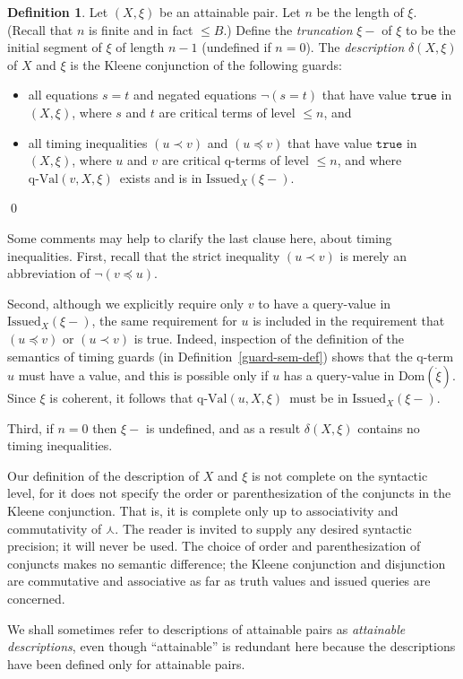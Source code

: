 \documentclass{LMCS}
\theoremstyle{definition}
\newtheorem{df}[thm]{Definition}
\newenvironment{ls}{\begin{itemize}}{\end{itemize}}
\newcommand{\Issued}{\text{Issued}}
\newcommand{\ans}{\dot}
\newcommand{\dom}[1]{\ensuremath{{\text{Dom}}(#1)}}
\newcommand{\kand}{\curlywedge}
\newcommand{\qval}[3]{\ensuremath{\text{q-Val}(#1,#2,#3)}}
\newcommand{\ttt}[1]{\ensuremath{\mathtt {#1}}}
\begin{document}
\begin{df}
Let $(X,\xi)$ be an attainable pair.  Let $n$ be
the length of $\xi$.  (Recall that $n$ is finite and in fact $\leq
B$.)  Define the \emph{truncation} $\xi-$ of $\xi$ to be the initial
segment of $\xi$ of length $n-1$ (undefined if $n=0$).  The
\emph{description} $\delta(X,\xi)$ of $X$ and $\xi$ is the Kleene
conjunction of the following guards:
\begin{ls}
\item all equations $s=t$ and negated equations $\neg(s=t)$ that have
  value \ttt{true} in $(X,\xi)$, where $s$ and $t$ are critical terms
  of level $\leq n$, and
\item all timing inequalities $(u\prec v)$ and $(u\preceq v)$ that
  have value \ttt{true} in $(X,\xi)$, where $u$ and $v$ are critical
  q-terms of level $\le n$, and where \qval vX\xi\ exists and is in
  $\Issued_X(\xi-)$.
\end{ls}
\qed\end{df}

Some comments may help to clarify the last clause here, about
timing inequalities.  First, recall that the strict inequality
$(u\prec v)$ is merely an abbreviation of $\neg(v\preceq u)$.

Second, although we explicitly require only $v$ to have a query-value
in $\Issued_X(\xi-)$,
the same requirement for $u$ is included in the
requirement that $(u\preceq v)$ or $(u\prec v)$ is true.  Indeed,
inspection of the definition of the semantics of timing guards (in
Definition~\ref{guard-sem-def}) shows that the q-term $u$ must have a
value, and this is possible only if $u$ has a query-value in
\dom{\ans\xi}.  Since $\xi$ is coherent, it follows that \qval uX\xi\
must be in $\Issued_X(\xi-)$.

Third, if $n=0$ then $\xi-$ is undefined, and as a result
$\delta(X,\xi)$ contains no timing inequalities.

Our definition of the description of $X$ and $\xi$ is not complete on
the syntactic level, for it does not specify the order or
parenthesization of the conjuncts in the Kleene conjunction.  That is,
it is complete only up to associativity and commutativity of $\kand$.
The reader is invited to supply any desired syntactic precision; it
will never be used. The choice of order and parenthesization of
conjuncts makes no semantic difference; the Kleene conjunction and
disjunction are commutative and associative as far as truth values and
issued queries are concerned.

We shall sometimes refer to descriptions of attainable pairs as
\emph{attainable descriptions}, even though ``attainable'' is
redundant here because the descriptions have been defined only for
attainable pairs.
\end{document}
